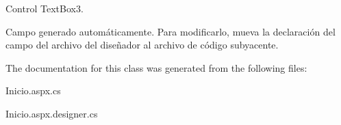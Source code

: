 Control Text\+Box3. 

Campo generado automáticamente. Para modificarlo, mueva la declaración del campo del archivo del diseñador al archivo de código subyacente. 

The documentation for this class was generated from the following files\+:\begin{DoxyCompactItemize}
\item 
Inicio.\+aspx.\+cs\item 
Inicio.\+aspx.\+designer.\+cs\end{DoxyCompactItemize}

